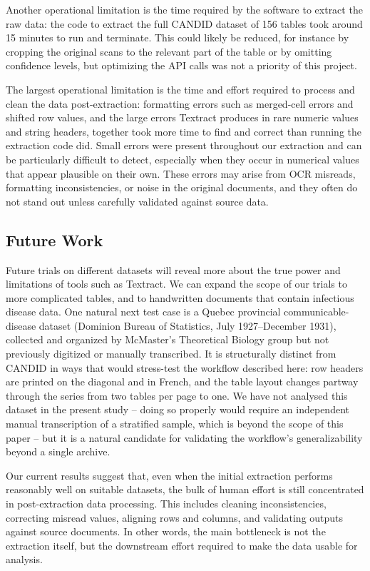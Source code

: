 \documentclass[12pt]{article}
\begin{document}
Another operational limitation is the time required by the software to extract the raw data: the code to extract the full CANDID dataset of 156 tables took around 15 minutes to run and terminate. This could likely be reduced, for instance by cropping the original scans to the relevant part of the table or by omitting confidence levels, but optimizing the API calls was not a priority of this project.

The largest operational limitation is the time and effort required to process and clean the data post-extraction: formatting errors such as merged-cell errors and shifted row values, and the large errors Textract produces in rare numeric values and string headers, together took more time to find and correct than running the extraction code did. Small errors were present throughout our extraction and can be particularly difficult to detect, especially when they occur in numerical values that appear plausible on their own. These errors may arise from OCR misreads, formatting inconsistencies, or noise in the original documents, and they often do not stand out unless carefully validated against source data.

\subsection{Future Work}\label{sec:futurework}

Future trials on different datasets will reveal more about the true power and limitations of tools such as Textract. We can expand the scope of our trials to more complicated tables, and to handwritten documents that contain infectious disease data. One natural next test case is a Quebec provincial communicable-disease dataset (Dominion Bureau of Statistics, July 1927--December 1931), collected and organized by McMaster's Theoretical Biology group but not previously digitized or manually transcribed. It is structurally distinct from CANDID in ways that would stress-test the workflow described here: row headers are printed on the diagonal and in French, and the table layout changes partway through the series from two tables per page to one. We have not analysed this dataset in the present study -- doing so properly would require an independent manual transcription of a stratified sample, which is beyond the scope of this paper -- but it is a natural candidate for validating the workflow's generalizability beyond a single archive.

Our current results suggest that, even when the initial extraction performs reasonably well on suitable datasets, the bulk of human effort is still concentrated in post-extraction data processing. This includes cleaning inconsistencies, correcting misread values, aligning rows and columns, and validating outputs against source documents. In other words, the main bottleneck is not the extraction itself, but the downstream effort required to make the data usable for analysis.
\end{document}

